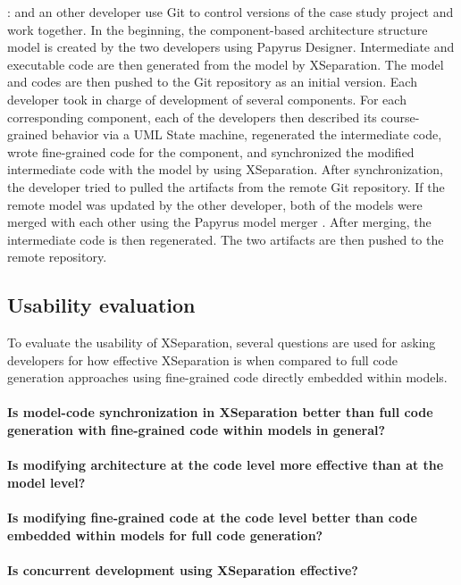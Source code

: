 \vskip 0.1cm
\noindent
{}:
 and an other developer  use Git to control versions of the case study project and work together.
In the beginning, the component-based architecture structure model is created by the two developers using Papyrus Designer.
Intermediate and executable code are then generated from the model by XSeparation.
The model and codes are then pushed to the Git repository as an initial version.
Each developer took in charge of development of several components.
For each corresponding component, each of the developers then described its course-grained behavior via a UML State machine, regenerated the intermediate code, wrote fine-grained code for the component, and synchronized the modified intermediate code with the model by using XSeparation.
After synchronization, the developer tried to pulled the artifacts from the remote Git repository.
If the remote model was updated by the other developer, both of the models were merged with each other using the Papyrus model merger \cite{collaborativepapyrus}.
After merging, the intermediate code is then regenerated.
The two artifacts are then pushed to the remote repository.
  



\subsection{Usability evaluation}
To evaluate the usability of XSeparation, several questions are used for asking developers for how effective XSeparation is when compared to full code generation approaches using fine-grained code directly embedded within models.

\paragraph{Is model-code synchronization in XSeparation better than full code generation with fine-grained code within models in general?}

\paragraph{Is modifying architecture at the code level more effective than at the model level?}

\paragraph{Is modifying fine-grained code at the code level better than code embedded within models for full code generation?}

\paragraph{Is concurrent development using XSeparation effective?}

\lipsum[1-2]
